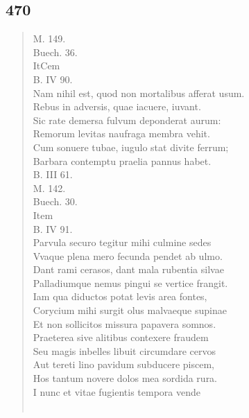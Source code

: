 \documentclass[11pt, a4paper]{report}
\begin{document}
            \subsection*{470}
      \begin{verse}
      M. 149. \\ Buech. 36. \\ ItCem \\ B. IV 90. \\ Nam nihil est, quod non mortalibus afferat usum. \\ Rebus in adversis, quae iacuere, iuvant. \\ Sic rate demersa fulvum deponderat aurum: \\ Remorum levitas naufraga membra vehit. \\ Cum sonuere tubae, iugulo stat divite ferrum; \\ Barbara contemptu praelia pannus habet. \\ B. III 61. \\ M. 142. \\ Buech. 30. \\ Item \\ B. IV 91. \\ Parvula securo tegitur mihi culmine sedes \\ Vvaque plena mero fecunda pendet ab ulmo. \\ Dant rami cerasos, dant mala rubentia silvae \\ Palladiumque nemus pingui se vertice frangit. \\ Iam qua diductos potat levis area fontes, \\ Corycium mihi surgit olus malvaeque supinae \\ Et non sollicitos missura papavera somnos. \\ Praeterea sive alitibus contexere fraudem \\ Seu magis inbelles libuit circumdare cervos \\ Aut tereti lino pavidum subducere piscem, \\ Hos tantum novere dolos mea sordida rura. \\ I nunc et vitae fugientis tempora vende \\ 
        ﻿\pagebreak 

\end{verse}
\end{document}
